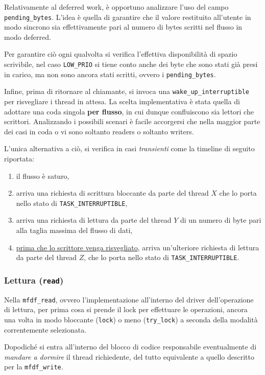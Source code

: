\documentclass{article}
\begin{document}
Relativamente al deferred work, è opportuno analizzare l'uso del campo \texttt{pending\_bytes}. L'idea è quella di garantire che il valore restituito all'utente in modo sincrono sia effettivamente pari al numero di bytes scritti nel flusso in modo deferred.

Per garantire ciò ogni qualvolta si verifica l'effettiva disponibilità di spazio scrivibile, nel caso \texttt{LOW\_PRIO} si tiene conto anche dei byte che sono stati già presi in carico, ma non sono ancora stati scritti, ovvero i \texttt{pending\_bytes}.

Infine, prima di ritornare al chiamante, si invoca una \texttt{wake\_up\_interruptible} per risvegliare i thread in attesa. La scelta implementativa è stata quella di adottare una coda singola \textbf{per flusso}, in cui dunque confluiscono sia lettori che scrittori. Analizzando i possibili scenari è facile accorgersi che nella maggior parte dei casi in coda o vi sono soltanto readers o soltanto writers.

L'unica alternativa a ciò, si verifica in casi \textit{transienti} come la timeline di seguito riportata:
\begin{enumerate}
        \item il flusso è saturo,
        \item arriva una richiesta di scrittura bloccante da parte del thread $X$ che lo porta nello stato di \texttt{TASK\_INTERRUPTIBLE},
        \item arriva una richiesta di lettura da parte del thread $Y$ di un numero di byte pari alla taglia massima del flusso di dati,
        \item \ul{prima che lo scrittore venga risvegliato}, arriva un'ulteriore richiesta di lettura da parte del thread $Z$, che lo porta nello stato di \texttt{TASK\_INTERRUPTIBLE}.
\end{enumerate}

\subsubsection{Lettura (\texttt{read})}
Nella \texttt{mfdf\_read}, ovvero l'implementazione all'interno del driver dell'operazione di lettura, per prima cosa si prende il lock per effettuare le operazioni, ancora una volta in modo bloccante (\texttt{lock}) o meno (\texttt{try\_lock}) a seconda della modalità correntemente selezionata.

Dopodiché si entra all'interno del blocco di codice responsabile eventualmente di \textit{mandare a dormire} il thread richiedente, del tutto equivalente a quello descritto per la \texttt{mfdf\_write}.
\end{document}
